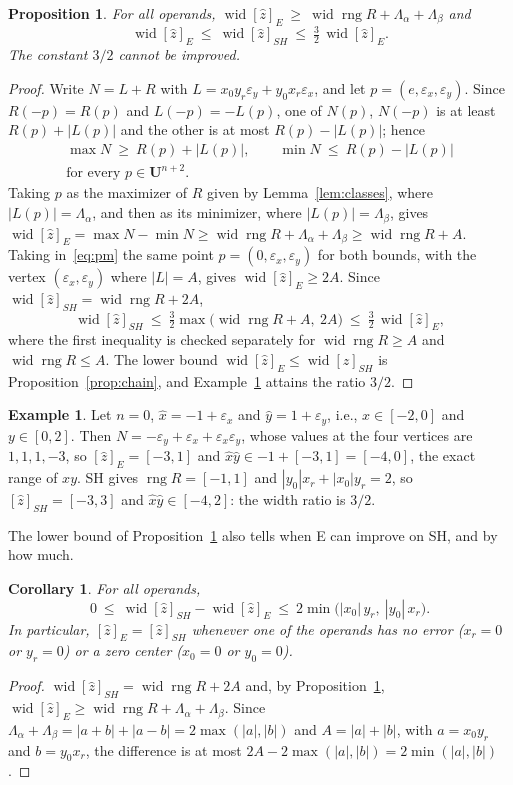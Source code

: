 \documentclass[10pt]{article}
\newtheorem{propo}{Proposition}
\newtheorem{corollary}{Corollary}
\theoremstyle{definition}
\newtheorem{example}{Example}
\newcommand{\U}{\mathbf{U}}
\newcommand{\eps}{\varepsilon}
\newcommand{\ex}{\eps_x}
\newcommand{\ey}{\eps_y}
\newcommand{\rng}{\operatorname{rng}}
\newcommand{\wid}{\operatorname{wid}}
\begin{document}
\begin{propo}
\label{prop:32}
For all operands, $\wid[\hat z]_E\ \ge\ \wid\rng R+\Lambda_\alpha+\Lambda_\beta$ and
\[
\wid[\hat z]_E\ \le\ \wid[\hat z]_{SH}\ \le\ \tfrac32\,\wid[\hat z]_E .
\]
The constant $3/2$ cannot be improved.
\end{propo}
\begin{proof}
Write $N=L+R$ with $L=x_0y_r\ey+y_0x_r\ex$, and let $p=(e,\ex,\ey)$. Since $R(-p)=R(p)$ and $L(-p)=-L(p)$, one of $N(p)$, $N(-p)$ is at least $R(p)+|L(p)|$ and the other is at most $R(p)-|L(p)|$; hence
\begin{equation}
\label{eq:pm}
\begin{gathered}\max N\ \ge\ R(p)+|L(p)|,\qquad \min N\ \le\ R(p)-|L(p)|\\ \text{for every } p\in\U^{n+2}.\end{gathered}
\end{equation}
Taking $p$ as the maximizer of $R$ given by Lemma~\ref{lem:classes}, where $|L(p)|=\Lambda_\alpha$, and then as its minimizer, where $|L(p)|=\Lambda_\beta$, gives $\wid[\hat z]_E=\max N-\min N\ge\wid\rng R+\Lambda_\alpha+\Lambda_\beta\ge\wid\rng R+A$. Taking in~\eqref{eq:pm} the same point $p=(0,\ex,\ey)$ for both bounds, with the vertex $(\ex,\ey)$ where $|L|=A$, gives $\wid[\hat z]_E\ge 2A$. Since $\wid[\hat z]_{SH}=\wid\rng R+2A$,
\[
\wid[\hat z]_{SH}\ \le\ \tfrac32\max\big(\wid\rng R+A,\ 2A\big)\ \le\ \tfrac32\,\wid[\hat z]_E ,
\]
where the first inequality is checked separately for $\wid\rng R\ge A$ and $\wid\rng R\le A$. The lower bound $\wid[\hat z]_E\le\wid[\hat z]_{SH}$ is Proposition~\ref{prop:chain}, and Example~\ref{ex:32} attains the ratio $3/2$.
\end{proof}

\begin{example}
\label{ex:32}
Let $n=0$, $\hat x = -1+\ex$ and $\hat y = 1+\ey$, i.e., $x\in[-2,0]$ and $y\in[0,2]$. Then $N = -\ey+\ex+\ex\ey$, whose values at the four vertices are $1,1,1,-3$, so $[\hat z]_E=[-3,1]$ and $\hat x\hat y\in -1+[-3,1]=[-4,0]$, the exact range of $xy$. SH gives $\rng R=[-1,1]$ and $|y_0|x_r+|x_0|y_r = 2$, so $[\hat z]_{SH}=[-3,3]$ and $\hat x\hat y\in[-4,2]$: the width ratio is $3/2$.
\end{example}

The lower bound of Proposition~\ref{prop:32} also tells when E can improve on SH, and by how much.

\begin{corollary}
\label{cor:gain}
For all operands,
\[
0\ \le\ \wid[\hat z]_{SH}-\wid[\hat z]_E\ \le\ 2\min\big(|x_0|\,y_r,\ |y_0|\,x_r\big).
\]
In particular, $[\hat z]_E=[\hat z]_{SH}$ whenever one of the operands has no error ($x_r=0$ or $y_r=0$) or a zero center ($x_0=0$ or $y_0=0$).
\end{corollary}
\begin{proof}
$\wid[\hat z]_{SH}=\wid\rng R+2A$ and, by Proposition~\ref{prop:32}, $\wid[\hat z]_E\ge\wid\rng R+\Lambda_\alpha+\Lambda_\beta$. Since $\Lambda_\alpha+\Lambda_\beta = |a+b|+|a-b| = 2\max(|a|,|b|)$ and $A=|a|+|b|$, with $a=x_0y_r$ and $b=y_0x_r$, the difference is at most $2A-2\max(|a|,|b|)=2\min(|a|,|b|)$.
\end{proof}
\end{document}
